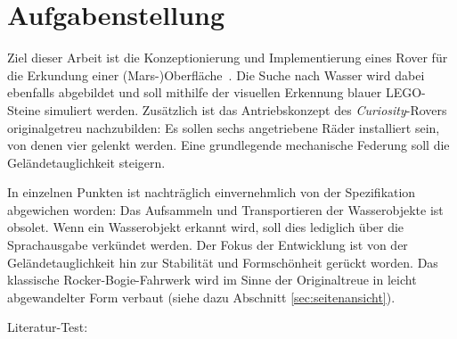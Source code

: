 \section{Aufgabenstellung}
\label{sec:aufgabe}

Ziel dieser Arbeit ist die \glqq Konzeptionierung und Implementierung eines Rover für die Erkundung einer (Mars-)Oberfläche\grqq\ \cite{mueller2019}.
Die Suche nach Wasser wird dabei ebenfalls abgebildet und soll mithilfe der visuellen Erkennung blauer LEGO-Steine simuliert werden.
Zusätzlich ist das Antriebskonzept des \textit{Curiosity}-Rovers originalgetreu nachzubilden: Es sollen sechs angetriebene Räder installiert sein, von denen vier gelenkt werden.
Eine grundlegende mechanische Federung soll die Geländetauglichkeit steigern.

In einzelnen Punkten ist nachträglich einvernehmlich von der Spezifikation abgewichen worden:
Das Aufsammeln und Transportieren der Wasserobjekte ist obsolet.
Wenn ein Wasserobjekt erkannt wird, soll dies lediglich über die Sprachausgabe verkündet werden.
Der Fokus der Entwicklung ist von der Geländetauglichkeit hin zur Stabilität und Formschönheit gerückt worden.
Das klassische Rocker-Bogie-Fahrwerk wird im Sinne der Originaltreue in leicht abgewandelter Form verbaut (siehe dazu Abschnitt \ref{sec:seitenansicht}).

Literatur-Test:
\cite{horan2013}
\cite{mcmanus2017}